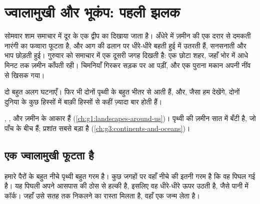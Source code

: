 \chapter{ज्वालामुखी और भूकंप: पहली झलक}\label{ch:g4:volcanoes-earthquakes-first-look}

सोमवार शाम समाचार में दूर के एक द्वीप का  दिखाया जाता है। अँधेरे में
ज़मीन की एक दरार से दमकती नारंगी  का फव्वारा फूटता है, और आग की 
ढलान पर धीरे-धीरे बहती हुई  में उतरती हैं, सनसनाती और भाप छोड़ती हुई।
गुरुवार को समाचार में एक दूसरी जगह दिखती है: एक छोटा शहर, जहाँ भोर में आधे
मिनट तक ज़मीन काँपती रही। चिमनियाँ गिरकर सड़क पर आ पड़ीं, और एक पुराना मकान
अपनी नींव से खिसक गया।

दो बहुत अलग घटनाएँ। फिर भी दोनों पृथ्वी के बहुत भीतर से आती हैं, और, जैसा हम
देखेंगे, दोनों दुनिया के कुछ हिस्सों में बाक़ी हिस्सों से कहीं ज़्यादा बार होती
हैं।

\begin{recall}
, ,  और  ज़मीन के आकार हैं
(\cref{ch:g1:landscapes-around-us})। पृथ्वी की ज़मीन सात  में बँटी है,
जो पाँच  के बीच हैं; प्रशांत  सबसे बड़ा  है
(\cref{ch:g3:continents-and-oceans})।
\end{recall}

\section{एक ज्वालामुखी फूटता है}

हमारे पैरों के बहुत नीचे पृथ्वी बहुत गरम है। कुछ जगहों पर वहाँ नीचे की 
इतनी गरम है कि वह पिघल गई है। यह पिघली  अपने आसपास की ठोस  से
हल्की है, इसलिए वह धीरे-धीरे ऊपर उठती है, जैसे पानी में कॉर्क। जहाँ उसे सतह तक
निकलने का रास्ता मिलता है, वहाँ एक  जन्म लेता है।

